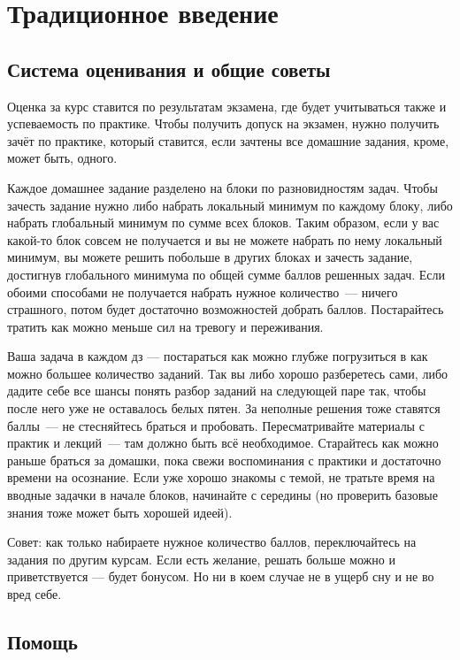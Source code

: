 \documentclass{article}
\begin{document}
    \section*{Традиционное введение}

    \subsection*{Система оценивания и общие советы}

    Оценка за курс ставится по результатам экзамена, где будет учитываться также и успеваемость по практике.
    Чтобы получить допуск на экзамен, нужно получить зачёт по практике, который ставится, если зачтены все домашние задания, кроме, может быть, одного.

    Каждое домашнее задание разделено на блоки по разновидностям задач.
    Чтобы зачесть задание нужно либо набрать локальный минимум по каждому блоку, либо набрать глобальный минимум по сумме всех блоков.
    Таким образом, если у вас какой-то блок совсем не получается и вы не можете набрать по нему локальный минимум, вы можете решить побольше в других блоках и зачесть задание, достигнув глобального минимума по общей сумме баллов решенных задач.
    Если обоими способами не получается набрать нужное количество~--- ничего страшного, потом будет достаточно возможностей добрать баллов.
    Постарайтесь тратить как можно меньше сил на тревогу и переживания.

    Ваша задача в каждом дз --- постараться как можно глубже погрузиться в как можно большее количество заданий.
    Так вы либо хорошо разберетесь сами, либо дадите себе все шансы понять разбор заданий на следующей паре так, чтобы после него уже не оставалось белых пятен.
    За неполные решения тоже ставятся баллы~--- не стесняйтесь браться и пробовать.
    Пересматривайте материалы с практик и лекций~--- там должно быть всё необходимое.
    Старайтесь как можно раньше браться за домашки, пока свежи воспоминания с практики и достаточно времени на осознание.
    Если уже хорошо знакомы с темой, не тратьте время на вводные задачки в начале блоков, начинайте с середины (но проверить базовые знания тоже может быть хорошей идеей).

    Совет: как только набираете нужное количество баллов, переключайтесь на задания по другим курсам.
    Если есть желание, решать больше можно и приветствуется --- будет бонусом.
    Но ни в коем случае не в ущерб сну и не во вред себе.

    \subsection*{Помощь}
\end{document}
